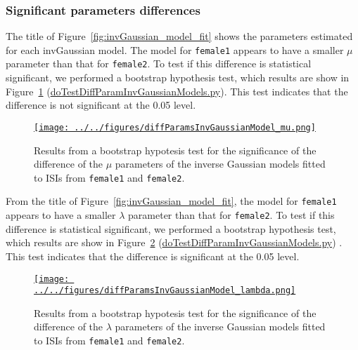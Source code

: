 \documentclass[10pt]{article}
\begin{document}
\subsubsection{Significant parameters differences}

The title of Figure~\ref{fig:invGaussian_model_fit} shows the parameters
estimated for each invGaussian model. The model for \texttt{female1} appears to
have a smaller $\mu$ parameter than that for \texttt{female2}. To test if this
difference is statistical significant, we performed a bootstrap hypothesis
test, which results are show in Figure~\ref{fig:diffMuInvGaussianModel_fit}
(\href{https://github.com/joacorapela/singleNeuronSpikesAnalysisTutorial/blob/master/code/scripts/doTestDiffParamInvGaussianModels.py}{doTestDiffParamInvGaussianModels.py}).
This test indicates that the difference is not significant at the 0.05 level.

\begin{figure}
    \href{http://www.gatsby.ucl.ac.uk/~rapela/singleNeuronSpikesAnalysisTutorial/figures/diffParamsInvGaussianModel_mu.html}{\texttt{[image: ../../figures/diffParamsInvGaussianModel\_mu.png]}}
    \caption{Results from a bootstrap hypotesis test for the significance of the difference of the $\mu$ parameters of the inverse Gaussian models fitted to ISIs from \texttt{female1} and \texttt{female2}.}
    \label{fig:diffMuInvGaussianModel_fit}
\end{figure}

From the title of Figure~\ref{fig:invGaussian_model_fit}, the model for
\texttt{female1} appears to have a smaller $\lambda$ parameter than that for
\texttt{female2}. To test if this difference is statistical significant, we
performed a bootstrap hypothesis test, which results are show in
Figure~\ref{fig:diffLambdaInvGaussianModel_fit} (\href{https://github.com/joacorapela/singleNeuronSpikesAnalysisTutorial/blob/master/code/scripts/doTestDiffParamInvGaussianModels.py}{doTestDiffParamInvGaussianModels.py}) . This test indicates that the
difference is significant at the 0.05 level.

\begin{figure}
    \href{http://www.gatsby.ucl.ac.uk/~rapela/singleNeuronSpikesAnalysisTutorial/figures/diffParamsInvGaussianModel_lambda.html}{\texttt{[image: ../../figures/diffParamsInvGaussianModel\_lambda.png]}}
    \caption{Results from a bootstrap hypotesis test for the significance of the difference of the $\lambda$ parameters of the inverse Gaussian models fitted to ISIs from \texttt{female1} and \texttt{female2}.}
    \label{fig:diffLambdaInvGaussianModel_fit}
\end{figure}
\end{document}
